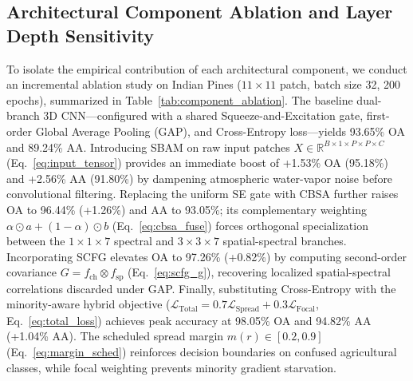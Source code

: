 \documentclass[manuscript,screen,review]{acmart}
\begin{document}
\subsection{Architectural Component Ablation and Layer Depth Sensitivity}
\label{subsec:ablation_analysis}
To isolate the empirical contribution of each architectural component, we conduct an incremental ablation study on Indian Pines ($11 \times 11$ patch, batch size 32, 200 epochs), summarized in Table~\ref{tab:component_ablation}. The baseline dual-branch 3D CNN---configured with a shared Squeeze-and-Excitation gate, first-order Global Average Pooling (GAP), and Cross-Entropy loss---yields 93.65\% OA and 89.24\% AA. Introducing SBAM on raw input patches $X \in \mathbb{R}^{B \times 1 \times P \times P \times C}$ (Eq.~\ref{eq:input_tensor}) provides an immediate boost of +1.53\% OA (95.18\%) and +2.56\% AA (91.80\%) by dampening atmospheric water-vapor noise before convolutional filtering. Replacing the uniform SE gate with CBSA further raises OA to 96.44\% (+1.26\%) and AA to 93.05\%; its complementary weighting $\alpha \odot a + (1-\alpha) \odot b$ (Eq.~\ref{eq:cbsa_fuse}) forces orthogonal specialization between the $1\times 1\times 7$ spectral and $3\times 3\times 7$ spatial-spectral branches. Incorporating SCFG elevates OA to 97.26\% (+0.82\%) by computing second-order covariance $G = f_{\text{ch}} \otimes f_{\text{sp}}$ (Eq.~\ref{eq:scfg_g}), recovering localized spatial-spectral correlations discarded under GAP. Finally, substituting Cross-Entropy with the minority-aware hybrid objective ($\mathcal{L}_{\text{Total}} = 0.7 \mathcal{L}_{\text{Spread}} + 0.3 \mathcal{L}_{\text{Focal}}$, Eq.~\ref{eq:total_loss}) achieves peak accuracy at 98.05\% OA and 94.82\% AA (+1.04\% AA). The scheduled spread margin $m(r) \in [0.2, 0.9]$ (Eq.~\ref{eq:margin_sched}) reinforces decision boundaries on confused agricultural classes, while focal weighting prevents minority gradient starvation.
\end{document}
